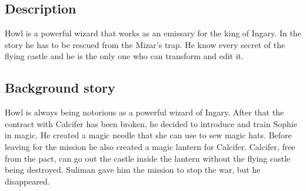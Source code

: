 \subsection{Description}
Howl is a powerful wizard that works as an emissary for the king of Ingary. In the story he has to be rescued from the Mizar's trap. He know every secret of the flying castle and he is the only one who can transform and edit it.

\subsection{Background story}
Howl is always being notorious as a powerful wizard of Ingary. After that the contract with Calcifer has been broken, he decided to introduce and train Sophie in magic. He created a magic needle that she can use to sew magic hats. Before leaving for the mission he also created a magic lantern for Calcifer. Calcifer, free from the pact, can go out the castle inside the lantern without the flying castle being destroyed. Suliman gave him the mission to stop the war, but he disappeared.
